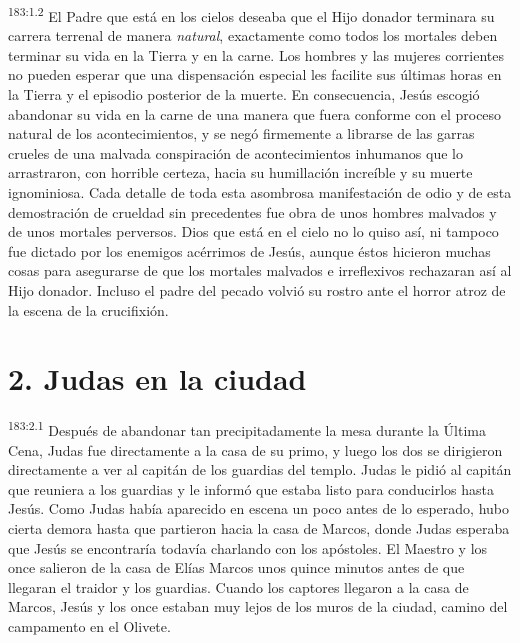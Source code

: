 \par 
\textsuperscript{183:1.2} El Padre que está en los cielos deseaba que el Hijo donador terminara su carrera terrenal de manera \textit{natural}, exactamente como todos los mortales deben terminar su vida en la Tierra y en la carne. Los hombres y las mujeres corrientes no pueden esperar que una dispensación especial les facilite sus últimas horas en la Tierra y el episodio posterior de la muerte. En consecuencia, Jesús escogió abandonar su vida en la carne de una manera que fuera conforme con el proceso natural de los acontecimientos, y se negó firmemente a librarse de las garras crueles de una malvada conspiración de acontecimientos inhumanos que lo arrastraron, con horrible certeza, hacia su humillación increíble y su muerte ignominiosa. Cada detalle de toda esta asombrosa manifestación de odio y de esta demostración de crueldad sin precedentes fue obra de unos hombres malvados y de unos mortales perversos. Dios que está en el cielo no lo quiso así, ni tampoco fue dictado por los enemigos acérrimos de Jesús, aunque éstos hicieron muchas cosas para asegurarse de que los mortales malvados e irreflexivos rechazaran así al Hijo donador. Incluso el padre del pecado volvió su rostro ante el horror atroz de la escena de la crucifixión.

\section*{2. Judas en la ciudad}
\par 
\textsuperscript{183:2.1} Después de abandonar tan precipitadamente la mesa durante la
Última Cena, Judas fue directamente a la casa de su primo, y luego los dos se dirigieron directamente a ver al capitán de los guardias del templo. Judas le pidió al capitán que reuniera a los guardias y le informó que estaba listo para conducirlos hasta Jesús. Como Judas había aparecido en escena un poco antes de lo esperado, hubo cierta demora hasta que partieron hacia la casa de Marcos, donde Judas esperaba que Jesús se encontraría todavía charlando con los apóstoles. El Maestro y los once salieron de la casa de Elías Marcos unos quince minutos antes de que llegaran el traidor y los guardias. Cuando los captores llegaron a la casa de Marcos, Jesús y los once estaban muy lejos de los muros de la ciudad, camino del campamento en el Olivete.

